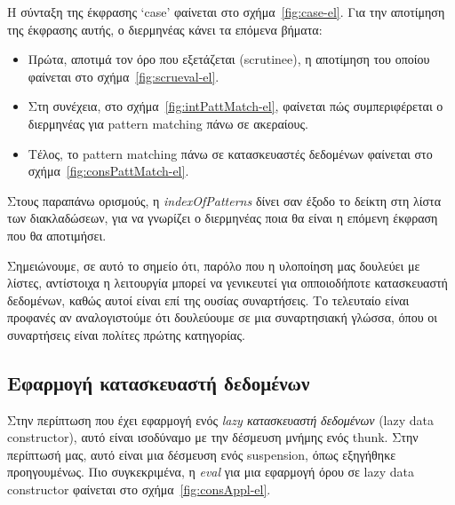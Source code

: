 \documentclass[diploma]{softlab-thesis}
\begin{document}
Η σύνταξη της έκφρασης `case' φαίνεται στο σχήμα~\ref{fig:case-el}. Για την αποτίμηση της έκφρασης αυτής,
ο διερμηνέας κάνει τα επόμενα βήματα:~
\begin{itemize}
  \item Πρώτα, αποτιμά τον όρο που εξετάζεται (scrutinee), η αποτίμηση του οποίου φαίνεται στο σχήμα~\ref{fig:scrueval-el}.
  \item Στη συνέχεια, στο σχήμα~\ref{fig:intPattMatch-el}, φαίνεται πώς συμπεριφέρεται ο διερμηνέας για pattern matching πάνω σε ακεραίους.
  \item Τέλος, το pattern matching πάνω σε κατασκευαστές δεδομένων φαίνεται στο σχήμα~\ref{fig:consPattMatch-el}.
\end{itemize}


Στους παραπάνω ορισμούς, η \textit{indexOfPatterns} δίνει σαν έξοδο το δείκτη 
στη λίστα των διακλαδώσεων, για να γνωρίζει ο διερμηνέας ποια θα είναι η επόμενη έκφραση που θα αποτιμήσει.

Σημειώνουμε, σε αυτό το σημείο ότι, παρόλο που η υλοποίηση μας δουλεύει με λίστες, αντίστοιχα η λειτουργία μπορεί να γενικευτεί 
για οπποιοδήποτε κατασκευαστή δεδομένων, καθώς αυτοί είναι επί της ουσίας συναρτήσεις. Το τελευταίο είναι προφανές αν αναλογιστούμε ότι δουλεύουμε σε μια 
συναρτησιακή γλώσσα, όπου οι συναρτήσεις είναι πολίτες πρώτης κατηγορίας.


\subsection{Εφαρμογή κατασκευαστή δεδομένων}

Στην περίπτωση που έχει εφαρμογή ενός \textit{lazy κατασκευαστή δεδομένων} (lazy data constructor),
αυτό είναι ισοδύναμο με την δέσμευση μνήμης ενός thunk. Στην περίπτωσή μας, αυτό είναι μια δέσμευση ενός 
suspension, όπως εξηγήθηκε προηγουμένως.
Πιο συγκεκριμένα, η \textit{eval} για μια εφαρμογή όρου σε lazy data constructor φαίνεται στο 
σχήμα~\ref{fig:consAppl-el}.
\end{document}
